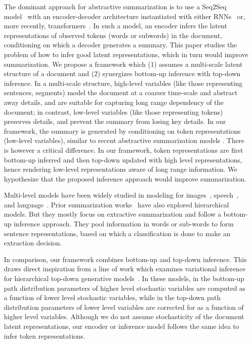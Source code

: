 \documentclass{article} \usepackage{iclr2022_conference,times}
\begin{document}
The dominant approach for abstractive summarization is to use a Seq2Seq model~\citep{sutskever2014sequence} with an encoder-decoder architecture instantiated with either RNNs~\citep{hochreiter1997long} or, more recently, transformers~\citep{vaswani2017attention}. In such a model, an encoder infers the latent representations of observed tokens (words or subwords) in the document, conditioning on which a decoder generates a summary. This paper studies the problem of how to infer good latent representations, which in turn would improve summarization. We propose a framework which (1) assumes a multi-scale latent structure of a document and (2) synergizes bottom-up inference with top-down inference. In a multi-scale structure, high-level variables (like those representing sentences, segments) model the document at a coarser time-scale and abstract away details, and are suitable for capturing long range dependency of the document; in contrast, low-level variables (like those representing tokens) preserves details, and prevent the summary from losing key details. In our framework, the summary is generated by conditioning on token representations (low-level variables), similar to recent abstractive summarization models \citep{zhang2020pegasus, zaheer2020big, beltagy2020longformer}. There is however a critical difference. In our framework, token representations are first bottom-up inferred and then top-down updated with high level representations, hence rendering low-level representations aware of long range information. We hypothesize that the proposed inference approach would improve summarization.



Multi-level models have been widely studied in modeling for images~\citep{sonderby2016ladder}, speech~\citep{mehri2016samplernn}, and language~\citep{chung2016hierarchical}. Prior summarization works~\citep{cheng-lapata-2016-neural, nallapati2016abstractive, zhang-etal-2019-hibert, xu-etal-2020-unsupervised} have also explored hierarchical models. But they mostly focus on extractive summarization and follow a bottom-up inference approach. They pool information in words or sub-words to form sentence representations, based on which a classification is done to make an extraction decision. 


In comparison, our framework combines bottom-up and top-down inference. This draws direct inspiration from a line of work which examines variational inference for hierarchical top-down generative models~\citep{sonderby2016ladder, maaloe2019biva, child2020very}. In these models, in the bottom-up path distribution parameters of higher level stochastic variables are computed as a function of lower level stochastic variables, while in the top-down path distribution parameters of lower level variables are corrected for as a function of higher level variables. Although we do not assume stochasticity of the document latent representations, our encoder or inference model follows the same idea to infer token representations. 
\end{document}
